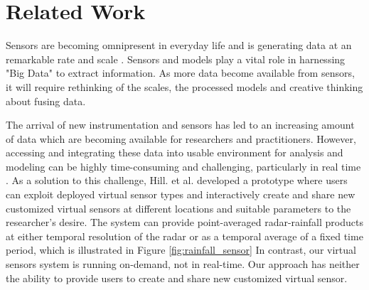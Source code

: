 \documentclass[USenglish]{uit-thesis}
\newcommand{\definition}[1]{%
  \refstepcounter{definition}%
  \par\noindent\textbf{The Definition~\thedefinition. #1}%
  \addcontentsline{def}{definition}
    {\protect\numberline{\thechapter.\thedefinition}#1}\par%
}
\begin{document}

\chapter{Related Work}
Sensors are becoming omnipresent in everyday life and is generating data at an remarkable rate and scale \cite{modelling}. Sensors and models play a vital role in harnessing "Big Data" to extract information.
As more data become available from sensors, it will require rethinking of the scales, the processed models and creative thinking about fusing data.


The arrival of new instrumentation and sensors has led to an increasing amount of data which are becoming available for researchers and practitioners. However, accessing and integrating these data into usable environment for analysis and modeling can be highly time-consuming and challenging, particularly in real time \cite{hill}.
As a solution to this challenge, Hill. et al. developed a prototype where users can exploit deployed virtual sensor types and interactively create and share new customized virtual sensors at different locations and suitable parameters to the researcher's desire.
The system can provide point-averaged radar-rainfall products at either temporal resolution of the radar or as a temporal average of a fixed time period, which is illustrated in Figure \ref{fig:rainfall_sensor}
In contrast, our virtual sensors system is running on-demand, not in real-time. Our approach has neither the ability to provide users to create and share new customized virtual sensor. 
\end{document}
